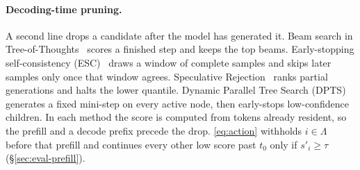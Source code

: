 \paragraph{Decoding-time pruning.}
A second line drops a candidate after the model has generated it.
Beam search in Tree-of-Thoughts~\cite{tot} scores a finished step and keeps the top beams.
Early-stopping self-consistency (ESC)~\cite{esc} draws a window of complete samples and skips later samples only once that window agrees.
Speculative Rejection~\cite{specrej} ranks partial generations and halts the lower quantile.
Dynamic Parallel Tree Search (DPTS)~\cite{dpts} generates a fixed mini-step on every active node, then early-stops low-confidence children.
In each method the score is computed from tokens already resident, so the prefill and a decode prefix precede the drop.
\eqref{eq:action} withholds $i{\in}\Lambda$ before that prefill and continues every other low score past $t_0$ only if $s'_i{\ge}\tau$ (\S\ref{sec:eval-prefill}).
